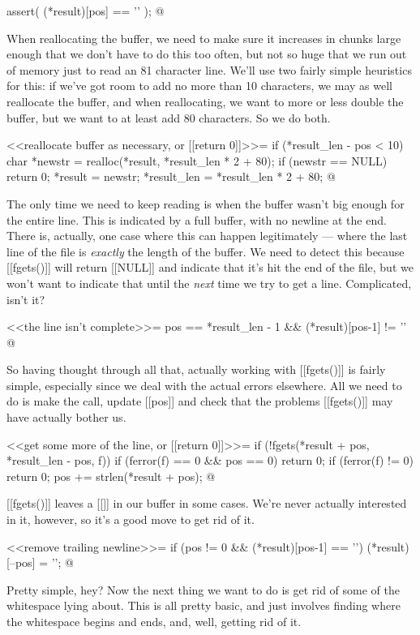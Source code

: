 \documentclass{article}
\begin{document}
assert( (*result)[pos] == '\0' );
@ 

When reallocating the buffer, we need to make sure it increases in
chunks large enough that we don't have to do this too often, but not
so huge that we run out of memory just to read an 81 character line.
We'll use two fairly simple heuristics for this: if we've got room to
add no more than 10 characters, we may as well reallocate the buffer,
and when reallocating, we want to more or less double the buffer, but
we want to at least add 80 characters. So we do both.

<<reallocate buffer as necessary, or [[return 0]]>>=
if (*result_len - pos < 10) {
	char *newstr = realloc(*result, *result_len * 2 + 80);
	if (newstr == NULL) {
		return 0;
	}
	*result = newstr;
	*result_len = *result_len * 2 + 80;
}
@ 

The only time we need to keep reading is when the buffer wasn't big
enough for the entire line. This is indicated by a full buffer, with
no newline at the end. There is, actually, one case where this can
happen legitimately --- where the last line of the file is
\emph{exactly} the length of the buffer. We need to detect this
because [[fgets()]] will return [[NULL]] and indicate that it's hit
the end of the file, but we won't want to indicate that until the
\emph{next} time we try to get a line. Complicated, isn't it?

<<the line isn't complete>>=
pos == *result_len - 1 && (*result)[pos-1] != '\n'
@ 

So having thought through all that, actually working with [[fgets()]]
is fairly simple, especially since we deal with the actual errors
elsewhere. All we need to do is make the call, update [[pos]] and
check that the problems [[fgets()]] may have actually bother us.

<<get some more of the line, or [[return 0]]>>=
if (!fgets(*result + pos, *result_len - pos, f)) {
	if (ferror(f) == 0 && pos == 0) return 0;
	if (ferror(f) != 0) return 0;
}
pos += strlen(*result + pos);
@ 

[[fgets()]] leaves a [[\n]] in our buffer in some cases. We're never
actually interested in it, however, so it's a good move to get rid of
it.

<<remove trailing newline>>=
if (pos != 0 && (*result)[pos-1] == '\n') {
	(*result)[--pos] = '\0';
}
@ 


Pretty simple, hey? Now the next thing we want to do is get rid of
some of the whitespace lying about. This is all pretty basic, and just
involves finding where the whitespace begins and ends, and, well,
getting rid of it.
\end{document}
